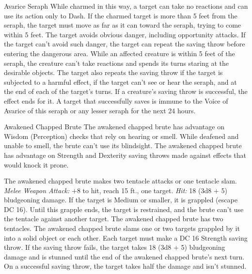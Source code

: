 \documentclass[10pt,a4paper,twoside,twocolumn,openany,bg=print,nodeprecatedcode]{dndbook}
\begin{document}
\begin{DndMonster}[float*=t]{Avarice Seraph}
While charmed in this way, a target can take no reactions and can use its action only to Dash. If the charmed target is more than 5 feet from the seraph, the target must move as far as it can toward the seraph, trying to come within 5 feet. The target avoids obvious danger, including opportunity attacks. If the target can't avoid such danger, the target can repeat the saving throw before entering the dangerous area. While an affected creature is within 5 feet of the seraph, the creature can't take reactions and spends its turns staring at the desirable objects.
The target also repeats the saving throw if the target is subjected to a harmful effect, if the target can't see or hear the seraph, and at the end of each of the target's turns. If a creature's saving throw is successful, the effect ends for it. A target that successfully saves is immune to the Voice of Avarice of this seraph or any lesser seraph for the next 24 hours.
\end{DndMonster}



\begin{DndMonster}[float*=t]{Awakened Chapped Brute}
\DndMonsterBasics[
armor-class = {14 (natural armor)},
hit-points = {\DndDice{12d10 + 60}},
speed = {40 ft.}
]
\DndMonsterAbilityScores[
 str = 20,
 dex = 10,
 con = 20,
 int = 5,
 wis = 10,
 cha = 5
]
\DndMonsterDetails[
skills = {Athletics +8},
damage-resistances = {necrotic},
senses = {blindsight 60 ft. (blind beyond this radius), passive perception 10},
languages = {understands one language but can't speak},
challenge = 7,
]
The awakened chapped brute has advantage on Wisdom (Perception) checks that rely on hearing or smell. While deafened and unable to smell, the brute can't use its blindsight.
The awakened chapped brute has advantage on Strength and Dexterity saving throws made against effects that would knock it prone.
\par
{}
The awakened chapped brute makes two tentacle attacks or one tentacle slam.
\textsl{Melee Weapon Attack:} +8 to hit, reach 15 ft., one target. \textsl{Hit:} 18 (3d8 + 5) bludgeoning damage. If the target is Medium or smaller, it is grappled (escape DC 16). Until this grapple ends, the target is restrained, and the brute can't use the tentacle against another target. The awakened chapped brute has two tentacles.
The awakened chapped brute slams one or two targets grappled by it into a solid object or each other. Each target must make a DC 16 Strength saving throw. If the saving throw fails, the target takes 18 (3d8 + 5) bludgeoning damage and is stunned until the end of the awakened chapped brute's next turn. On a successful saving throw, the target takes half the damage and isn't stunned.
\end{DndMonster}
\end{document}
